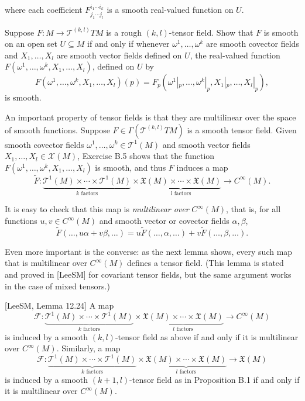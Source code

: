 where each coefficient $F^{i_1 \cdots i_k}_{j_1 \cdots j_l}$ is a smooth real-valued function on $U$.

\begin{exercise}\label{exer:smooth-tensor-field-criterion}
Suppose $F: M \to \mathcal{T}^{(k,l)} T M$ is a rough $(k,l)$-tensor field. Show that $F$ is smooth on an open set $U \subseteq M$ if and only if whenever $\omega^1, \ldots, \omega^k$ are smooth covector fields and $X_1, \ldots, X_l$ are smooth vector fields defined on $U$, the real-valued function $F(\omega^1, \ldots, \omega^k, X_1, \ldots, X_l)$, defined on $U$ by
\[F(\omega^1, \ldots, \omega^k, X_1, \ldots, X_l)(p) = F_p(\omega^1|_p, \ldots, \omega^k|_p, X_1|_p, \ldots, X_l|_p),\]
is smooth.
\end{exercise}

An important property of tensor fields is that they are multilinear over the space of smooth functions. Suppose $F \in \Gamma(\mathcal{T}^{(k,l)} T M)$ is a smooth tensor field. Given smooth covector fields $\omega^1, \ldots, \omega^k \in \mathcal{T}^1(M)$ and smooth vector fields $X_1, \ldots, X_l \in \mathcal{X}(M)$, Exercise B.5 shows that the function $F(\omega^1, \ldots, \omega^k, X_1, \ldots, X_l)$ is smooth, and thus $F$ induces a map
\[
\tilde{F}: \underbrace{\mathcal{T}^1(M) \times \cdots \times \mathcal{T}^1(M)}_{k \text{ factors}} \times \underbrace{\mathfrak{X}(M) \times \cdots \times \mathfrak{X}(M)}_{l \text{ factors}} \to C^\infty(M).
\]

It is easy to check that this map is \emph{multilinear over} $C^\infty(M)$, that is, for all functions $u, v \in C^\infty(M)$ and smooth vector or covector fields $\alpha, \beta$,
\[
\tilde{F}(\ldots, u\alpha + v\beta, \ldots) = u\tilde{F}(\ldots, \alpha, \ldots) + v\tilde{F}(\ldots, \beta, \ldots).
\]

Even more important is the converse: as the next lemma shows, every such map that is multilinear over $C^\infty(M)$ defines a tensor field. (This lemma is stated and proved in [LeeSM] for covariant tensor fields, but the same argument works in the case of mixed tensors.)

\begin{lemma}
\label{lem:tensor-characterization-lemma}

[LeeSM, Lemma 12.24] A map
\[
\mathcal{F}: \underbrace{\mathcal{T}^1(M) \times \cdots \times \mathcal{T}^1(M)}_{k \text{ factors}} \times \underbrace{\mathfrak{X}(M) \times \cdots \times \mathfrak{X}(M)}_{l \text{ factors}} \to C^\infty(M)
\]
is induced by a smooth $(k,l)$-tensor field as above if and only if it is multilinear over $C^\infty(M)$. Similarly, a map
\[
\mathcal{F}: \underbrace{\mathcal{T}^1(M) \times \cdots \times \mathcal{T}^1(M)}_{k \text{ factors}} \times \underbrace{\mathfrak{X}(M) \times \cdots \times \mathfrak{X}(M)}_{l \text{ factors}} \to \mathfrak{X}(M)
\]
is induced by a smooth $(k+1,l)$-tensor field as in Proposition B.1 if and only if it is multilinear over $C^\infty(M)$.
\end{lemma}

